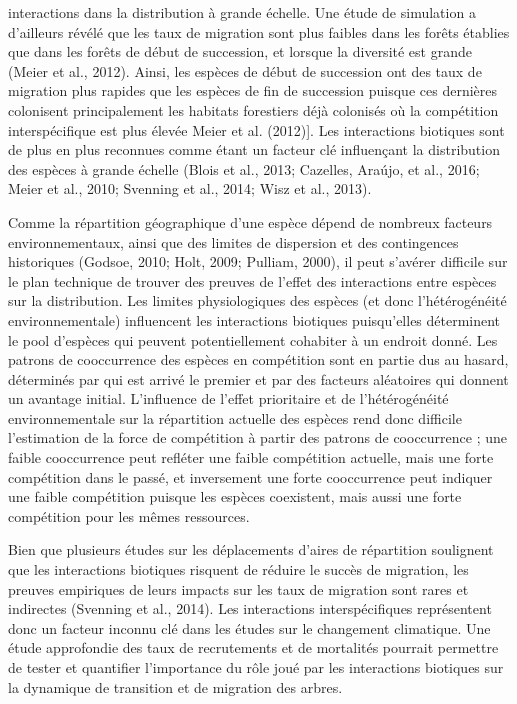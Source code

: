 \documentclass[
]{article}
\begin{document}
interactions dans la distribution à grande échelle. Une étude de
simulation a d'ailleurs révélé que les taux de migration sont plus
faibles dans les forêts établies que dans les forêts de début de
succession, et lorsque la diversité est grande (Meier et al., 2012).
Ainsi, les espèces de début de succession ont des taux de migration plus
rapides que les espèces de fin de succession puisque ces dernières
colonisent principalement les habitats forestiers déjà colonisés où la
compétition interspécifique est plus élevée Meier et al. (2012){]}. Les
interactions biotiques sont de plus en plus reconnues comme étant un
facteur clé influençant la distribution des espèces à grande échelle
(Blois et al., 2013; Cazelles, Araújo, et al., 2016; Meier et al., 2010;
Svenning et al., 2014; Wisz et al., 2013).

Comme la répartition géographique d'une espèce dépend de nombreux
facteurs environnementaux, ainsi que des limites de dispersion et des
contingences historiques (Godsoe, 2010; Holt, 2009; Pulliam, 2000), il
peut s'avérer difficile sur le plan technique de trouver des preuves de
l'effet des interactions entre espèces sur la distribution. Les limites
physiologiques des espèces (et donc l'hétérogénéité environnementale)
influencent les interactions biotiques puisqu'elles déterminent le pool
d'espèces qui peuvent potentiellement cohabiter à un endroit donné. Les
patrons de cooccurrence des espèces en compétition sont en partie dus au
hasard, déterminés par qui est arrivé le premier et par des facteurs
aléatoires qui donnent un avantage initial. L'influence de l'effet
prioritaire et de l'hétérogénéité environnementale sur la répartition
actuelle des espèces rend donc difficile l'estimation de la force de
compétition à partir des patrons de cooccurrence ; une faible
cooccurrence peut refléter une faible compétition actuelle, mais une
forte compétition dans le passé, et inversement une forte cooccurrence
peut indiquer une faible compétition puisque les espèces coexistent,
mais aussi une forte compétition pour les mêmes ressources.

Bien que plusieurs études sur les déplacements d'aires de répartition
soulignent que les interactions biotiques risquent de réduire le succès
de migration, les preuves empiriques de leurs impacts sur les taux de
migration sont rares et indirectes (Svenning et al., 2014). Les
interactions interspécifiques représentent donc un facteur inconnu clé
dans les études sur le changement climatique. Une étude approfondie des
taux de recrutements et de mortalités pourrait permettre de tester et
quantifier l'importance du rôle joué par les interactions biotiques sur
la dynamique de transition et de migration des arbres.
\end{document}
